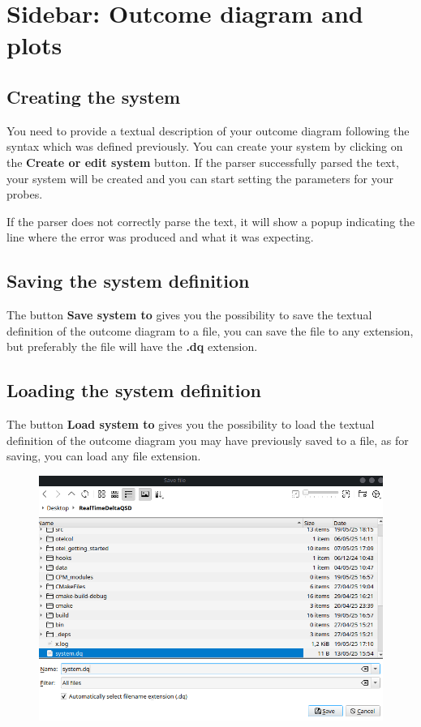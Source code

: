 \section{Sidebar: Outcome diagram and plots}

    \subsection{Creating the system}

    You need to provide a textual description of your outcome diagram following the syntax which was defined previously.
    You can create your system by clicking on the \textbf{Create or edit system} button. If the parser successfully parsed the text, your system will be created and you can start setting the parameters for your probes.
    
    If the parser does not correctly parse the text, it will show a popup indicating the line where the error was produced and what it was expecting. 
    
    \subsection{Saving the system definition}

    The button \textbf{Save system to} gives you the possibility to save the textual definition of the outcome diagram to a file, you can save the file to any extension, but preferably the file will have the \textbf{.dq} extension.

    \subsection{Loading the system definition}

    The button \textbf{Load system to} gives you the possibility to load the textual definition of the outcome diagram you may have previously saved to a file, as for saving, you can load any file extension.

    
    \begin{figure}[H]
        \begin{center}
            \includegraphics[width = \textwidth]{img/save_system.png}
        \end{center}
    \end{figure}
        
